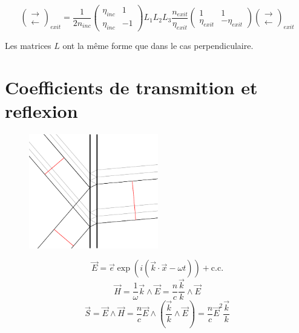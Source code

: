 \documentclass[a4paper,english]{article}
\begin{document}
\begin{dmath}
\begin{pmatrix}\rightarrow \\ \leftarrow\end{pmatrix}_{exit} =
\frac{1}{2 n_{inc}} \begin{pmatrix} \eta_{inc} & 1 \\ \eta_{inc} & -1 \end{pmatrix} L_1 L_2 L_3 \frac{n_{exit}}{\eta_{exit}} \begin{pmatrix} 1 & 1 \\ \eta_{exit} & -\eta_{exit} \end{pmatrix}
\begin{pmatrix}\rightarrow \\ \leftarrow\end{pmatrix}_{exit}
\end{dmath}

Les matrices $L$ ont la même forme que dans le cas perpendiculaire.
















\section{Coefficients de transmition et reflexion}
\begin{figure}[H]
	\centering
	\includegraphics[height=5cm]{Figures/transmittance.pdf}
\end{figure}

\begin{dmath}
	\vec E = \vec e \exp(i (\vec k \cdot \vec x - \omega t)) + \text{c.c.}
\end{dmath}
\begin{equation}
	\vec H = \frac{1}{\omega} \vec k \wedge \vec E = \frac{n}{c} \frac{\vec k}{k} \wedge \vec E
\end{equation}
\begin{equation}
	\vec S = \vec E \wedge \vec H = \frac{n}{c} \vec E \wedge (\frac{\vec k}{k} \wedge \vec E) = \frac{n}{c} \vec E^2 \frac{\vec k}{k}
\end{equation}
\end{document}
